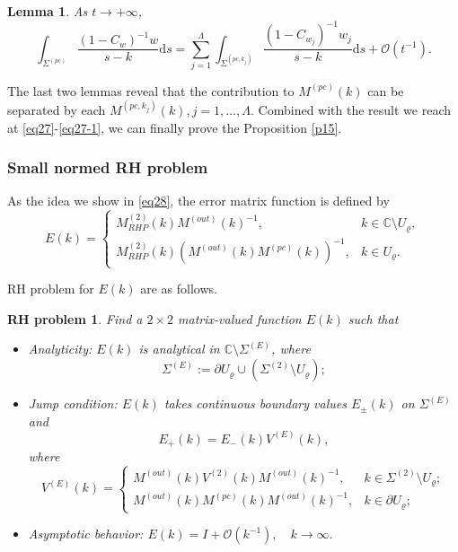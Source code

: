 \documentclass[11pt]{article}
\numberwithin{equation}{section}
\newtheorem{lemma}{Lemma}
\newtheorem{RHP}{RH problem}
\begin{document}
\begin{lemma}\label{l6}
    As $t \to +\infty$,
\begin{equation*}
    \int_{\Sigma^{(pc)}} \frac{(1 - C_w)^{-1}  w}{s - k} \mathrm{d}s
= \sum_{j=1}^\Lambda \int_{\Sigma^{(pc, k_j)}} \frac{(1 - C_{w_j})^{-1} w_j}{s - k}\mathrm{d}s + \mathcal{O}(t^{-1}).
\end{equation*}
\end{lemma}
The last two lemmas reveal that the contribution to $M^{(pc)}(k)$ can be separated by each $M^{(pc,k_j)}(k),j=1,\dots,\Lambda.$ Combined with the result we reach at \eqref{eq27}-\eqref{eq27-1}, we can finally prove the Proposition \ref{p15}.

\subsubsection{Small normed RH problem}
As the idea we show in \eqref{eq28}, the error matrix function is defined by
\begin{equation*}
    E(k) =
\begin{cases}
M^{(2)}_{RHP}(k)M^{(out)}(k)^{-1}, & k \in \mathbb{C} \setminus U_{\varrho}, \\
M^{(2)}_{RHP}(k)\left(M^{(out)}(k)M^{(pc)}(k)\right)^{-1}, & k \in U_{\varrho}.
\end{cases}
\end{equation*}

RH problem for $E(k)$ are as follows.
\begin{RHP}
    Find a $2 \times 2$ matrix-valued function $E(k)$ such that  \begin{itemize}
        \item Analyticity: $E(k)$ is analytical in $\mathbb{C} \setminus \Sigma^{(E)}$, where
\begin{equation*}
    \Sigma^{(E)} := \partial U_{\varrho} \cup \left( \Sigma^{(2)} \setminus U_{\varrho}\right);
\end{equation*}
\item Jump condition: $E(k)$ takes continuous boundary values $E_\pm(k)$ on $\Sigma^{(E)}$ and
\begin{equation*}
E_+(k) = E_-(k) V^{(E)}(k),
\end{equation*}
where
\begin{equation*}
V^{(E)}(k) =
\begin{cases}
M^{(out)}(k)V^{(2)}(k)M^{(out)}(k)^{-1}, & k \in \Sigma^{(2)} \setminus U_{\varrho}; \\
M^{(out)}(k)M^{(pc)}(k)M^{(out)}(k)^{-1}, & k \in \partial U_{\varrho};
\end{cases}
\end{equation*}
\item Asymptotic behavior: $E(k) = I + \mathcal{O}(k^{-1}), \quad k \to \infty .$
  \end{itemize}
\end{RHP}
\end{document}
